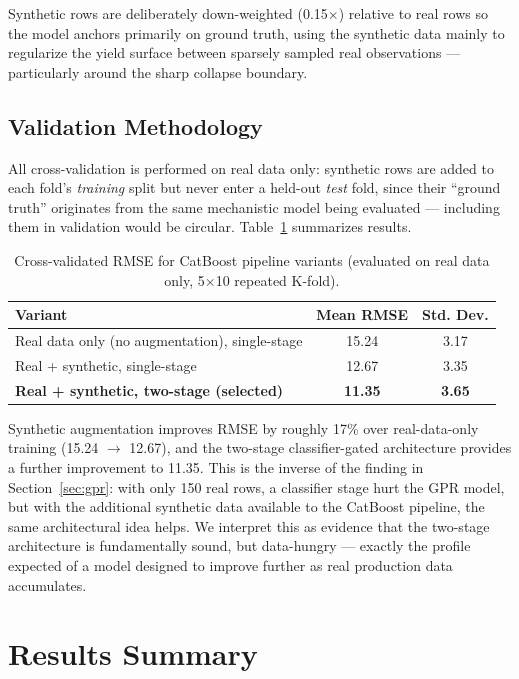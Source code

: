 \documentclass[11pt,a4paper]{article}
\begin{document}
Synthetic rows are deliberately down-weighted (0.15$\times$) relative to real rows so the model
anchors primarily on ground truth, using the synthetic data mainly to regularize the yield surface
between sparsely sampled real observations --- particularly around the sharp collapse boundary.

\subsection{Validation Methodology}

All cross-validation is performed on real data only: synthetic rows are added to each fold's
\emph{training} split but never enter a held-out \emph{test} fold, since their ``ground truth''
originates from the same mechanistic model being evaluated --- including them in validation would
be circular. Table~\ref{tab:catboost-variants} summarizes results.

\begin{table}[h]
\centering
\caption{Cross-validated RMSE for CatBoost pipeline variants (evaluated on real data only, 5$\times$10 repeated K-fold).}
\label{tab:catboost-variants}
\begin{tabular}{lcc}
\toprule
\textbf{Variant} & \textbf{Mean RMSE} & \textbf{Std. Dev.} \\
\midrule
Real data only (no augmentation), single-stage & 15.24 & 3.17 \\
Real + synthetic, single-stage & 12.67 & 3.35 \\
\textbf{Real + synthetic, two-stage (selected)} & \textbf{11.35} & \textbf{3.65} \\
\bottomrule
\end{tabular}
\end{table}

\noindent Synthetic augmentation improves RMSE by roughly 17\% over real-data-only training
(15.24 $\to$ 12.67), and the two-stage classifier-gated architecture provides a further
improvement to 11.35. This is the inverse of the finding in Section~\ref{sec:gpr}: with only 150
real rows, a classifier stage hurt the GPR model, but with the additional synthetic data available
to the CatBoost pipeline, the same architectural idea helps. We interpret this as evidence that
the two-stage architecture is fundamentally sound, but data-hungry --- exactly the profile expected
of a model designed to improve further as real production data accumulates.

\section{Results Summary}
\end{document}
